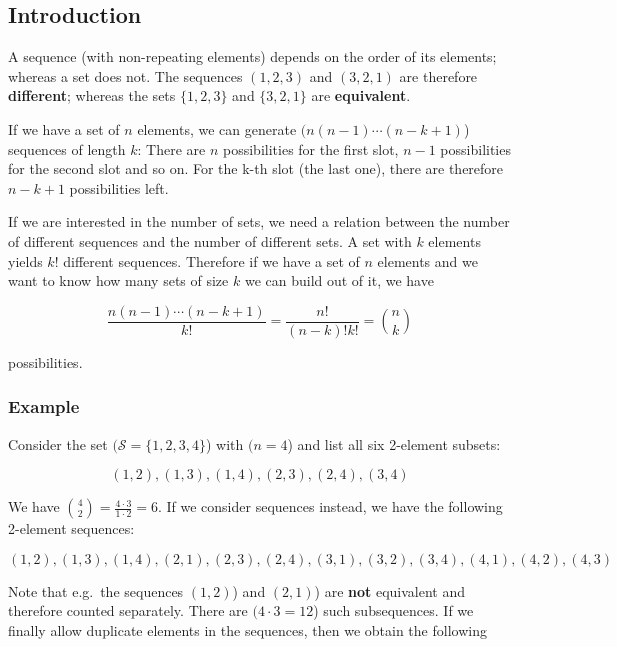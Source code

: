 
\subsection{Introduction}

A sequence (with non-repeating elements) depends on the order of its elements; whereas a set does not. The sequences $(1,2,3)$ and $(3,2,1)$ are therefore \textbf{different}; whereas the sets $\{1,2,3\}$ and $\{3,2,1\}$ are \textbf{equivalent}.

If we have a set of $n$ elements, we can generate $(n(n-1)\cdots(n-k+1)$) sequences of length $k$: There are $n$ possibilities for the first slot, $n-1$ possibilities for the second slot and so on. For the k-th slot (the last one), there are therefore $n-k+1$ possibilities left.

If we are interested in the number of sets, we need a relation between the number of different sequences and the number of different sets. A set with $k$ elements yields $k!$ different sequences. Therefore if we have a set of $n$ elements and we want to know how many sets of size $k$ we can build out of it, we have

\begin{equation}
\frac{n(n-1)\cdots(n-k+1)}{k!} = \frac{n!}{(n-k)!k!} = {n \choose k}
\end{equation}

possibilities.

\subsubsection{Example}

Consider the set $(\mathcal{S} =
\{1,2,3,4\}$) with $(n=4$)
and list all six 2-element subsets:

\[(1,2), (1,3), (1,4), (2,3), (2,4), (3,4)\]

We have ${4 \choose 2} = \frac{4 \cdot 3}{1 \cdot 2} = 6$. If we consider sequences instead, we have the following 2-element sequences:

\[(1,2), (1,3), (1,4), (2,1), (2,3), (2,4), (3,1), (3,2), (3,4), (4,1), (4,2), (4,3)\]

Note that e.g.~the sequences $(1,2)$) and $(2,1)$) are \textbf{not} equivalent and therefore counted separately. There are $(4 \cdot 3 = 12$) such subsequences. If we finally allow duplicate elements in the sequences, then we obtain the following

